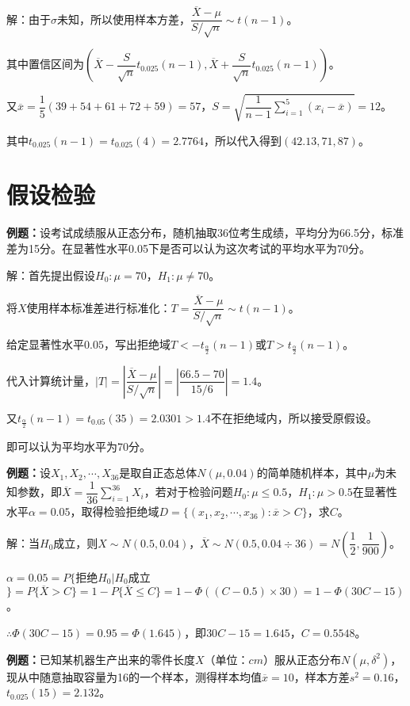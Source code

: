 \documentclass[UTF8, 12pt]{ctexart}
\begin{document}
解：由于$\sigma$未知，所以使用样本方差，$\dfrac{\overline{X}-\mu}{S/\sqrt{n}}\sim t(n-1)$。

其中置信区间为$\left(\overline{X}-\dfrac{S}{\sqrt{n}}t_{0.025}(n-1),\overline{X}+\dfrac{S}{\sqrt{n}}t_{0.025}(n-1)\right)$。

又$\overline{x}=\dfrac{1}{5}(39+54+61+72+59)=57$，$S=\sqrt{\dfrac{1}{n-1}\sum\limits_{i=1}^5(x_i-\overline{x})}=12$。

其中$t_{0.025}(n-1)=t_{0.025}(4)=2.7764$，所以代入得到$(42.13,71,87)$。

\section{假设检验}

\textbf{例题：}设考试成绩服从正态分布，随机抽取36位考生成绩，平均分为66.5分，标准差为15分。在显著性水平0.05下是否可以认为这次考试的平均水平为70分。

解：首先提出假设$H_0:\mu=70$，$H_1:\mu\neq70$。

将$X$使用样本标准差进行标准化：$T=\dfrac{\overline{X}-\mu}{S/\sqrt{n}}\sim t(n-1)$。

给定显著性水平$0.05$，写出拒绝域$T<-t_{\frac{\alpha}{2}}(n-1)$或$T>t_{\frac{\alpha}{2}}(n-1)$。

代入计算统计量，$\vert T\vert=\left\vert\dfrac{\overline{X}-\mu}{S/\sqrt{n}}\right\vert=\left\vert\dfrac{66.5-70}{15/6}\right\vert=1.4$。

又$t_{\frac{\alpha}{2}}(n-1)=t_{0.05}(35)=2.0301>1.4$不在拒绝域内，所以接受原假设。

即可以认为平均水平为70分。

\textbf{例题：}设$X_1,X_2,\cdots,X_{36}$是取自正态总体$N(\mu,0.04)$的简单随机样本，其中$\mu$为未知参数，即$\overline{X}=\dfrac{1}{36}\sum\limits_{i=1}^{36}X_i$，若对于检验问题$H_0:\mu\leqslant0.5$，$H_1:\mu>0.5$在显著性水平$\alpha=0.05$，取得检验拒绝域$D=\{(x_1,x_2,\cdots,x_{36}):\overline{x}>C\}$，求$C$。

解：当$H_0$成立，则$X\sim N(0.5,0.04)$，$\overline{X}\sim N(0.5,0.04\div36)=N\left(\dfrac{1}{2},\dfrac{1}{900}\right)$。

$\alpha=0.05=P\{$拒绝$H_0|H_0$成立$\}=P\{\overline{X}>C\}=1-P\{\overline{X}\leqslant C\}=1-\varPhi((C-0.5)\times30)=1-\varPhi(30C-15)$。

$\therefore\varPhi(30C-15)=0.95=\varPhi(1.645)$，即$30C-15=1.645$，$C=0.5548$。

\textbf{例题：}已知某机器生产出来的零件长度$X$（单位：$cm$）服从正态分布$N(\mu,\delta^2)$，现从中随意抽取容量为16的一个样本，测得样本均值$\overline{x}=10$，样本方差$s^2=0.16$，$t_{0.025}(15)=2.132$。
\end{document}
